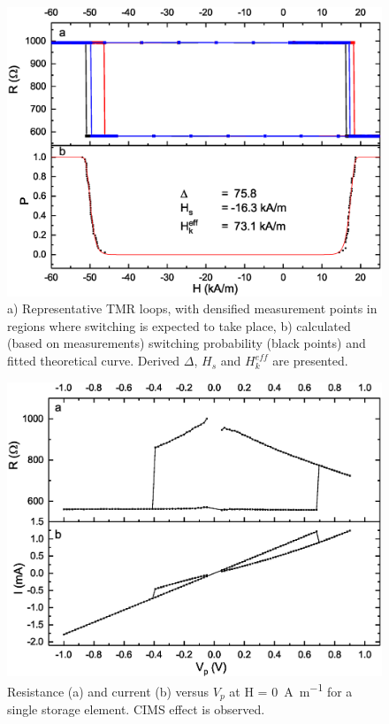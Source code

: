     \begin{figure}[H]
        \centering
        \includegraphics[width=0.65\paperwidth]{img/05/StabilitySato.eps}
        \caption{a) Representative TMR loops, with densified measurement points in regions where switching is expected to take place, b) calculated (based on measurements) switching probability (black points) and fitted theoretical curve. Derived $\Delta$, $H_s$ and $H_k^{eff}$ are presented. }
        \label{ExperimentMeasurementTMRSato}
    \end{figure}
    
    \begin{figure}[H]
        \centering
        \includegraphics[width=0.65\paperwidth]{img/05/ResultsCIMS1.eps}
        \caption{Resistance (a) and current (b) versus $V_p$ at \SI[parse-numbers = false, number-math-rm = \ensuremath, per-mode=symbol]{H = 0}{\ampere\per\metre} for a single storage element. CIMS effect is observed.}
        \label{ExperimentMeasurementCIMS1}
    \end{figure}
    
